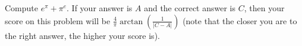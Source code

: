 Compute $e^{\pi}+\pi^e$. If your answer is $A$ and the correct answer is $C$, then your score on this problem will be $\frac{4}{\pi}\arctan\left(\frac{1}{\left|C-A\right|}\right)$ (note that the closer you are to the right answer, the higher your score is).